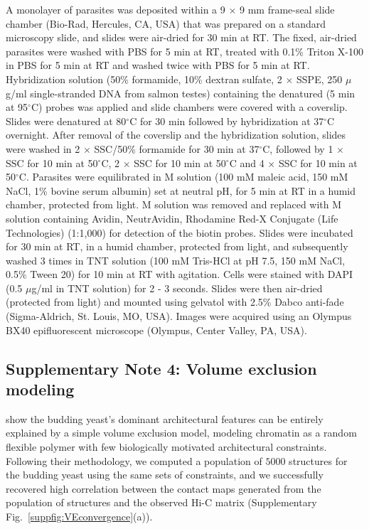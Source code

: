 A monolayer of parasites was deposited within a 9 $\times$ 9 mm frame-seal
slide chamber (Bio-Rad, Hercules, CA, USA) that was prepared on a standard
microscopy slide, and slides were air-dried for 30 min at RT. The fixed,
air-dried parasites were washed with PBS for 5 min at RT, treated with 0.1\%
Triton X-100 in PBS for 5 min at RT and washed twice with PBS for 5 min at RT.
Hybridization solution (50\% formamide, 10\% dextran sulfate, 2 $\times$ SSPE,
250 $\mu$g/ml single-stranded DNA from salmon testes) containing the denatured
(5 min at 95$^\circ$C) probes was applied and slide chambers were covered with
a coverslip. Slides were denatured at 80$^\circ$C for 30 min followed by
hybridization at 37$^\circ$C overnight. After removal of the coverslip and the
hybridization solution, slides were washed in 2 $\times$ SSC/50\% formamide
for 30 min at 37$^\circ$C, followed by 1 $\times$ SSC for 10 min at
50$^\circ$C, 2 $\times$ SSC for 10 min at 50$^\circ$C and 4 $\times$ SSC for
10 min at 50$^\circ$C. Parasites were equilibrated in M solution (100 mM
maleic acid, 150 mM NaCl, 1\% bovine serum albumin) set at neutral pH, for 5
min at RT in a humid chamber, protected from light. M solution was removed and
replaced with M solution containing Avidin, NeutrAvidin, Rhodamine Red-X
Conjugate (Life Technologies) (1:1,000) for detection of the biotin probes.
Slides were incubated for 30 min at RT, in a humid chamber, protected from
light, and subsequently washed 3 times in TNT solution (100 mM Tris-HCl at pH
7.5, 150 mM NaCl, 0.5\% Tween 20) for 10 min at RT with agitation. Cells were
stained with DAPI (0.5 $\mu$g/ml in TNT solution) for 2 - 3  seconds. Slides
were then air-dried (protected from light) and mounted using gelvatol with
2.5\% Dabco anti-fade (Sigma-Aldrich, St. Louis, MO, USA). Images were
acquired using an Olympus BX40 epifluorescent microscope (Olympus, Center
Valley, PA, USA).


\subsection*{Supplementary Note 4: Volume exclusion modeling}
\label{supp:volume-exclusion}

\citet{tjong:physical} show the budding yeast's dominant architectural
features can be entirely explained by a simple volume exclusion model,
modeling chromatin as a random flexible polymer with few biologically
motivated architectural constraints. Following their methodology, we computed
a population of $5000$ structures for the budding yeast using the same sets of
constraints, and we successfully recovered high correlation between the
contact maps generated from the population of structures and the observed Hi-C
matrix (Supplementary Fig.~\ref{suppfig:VEconvergence}(a)).

